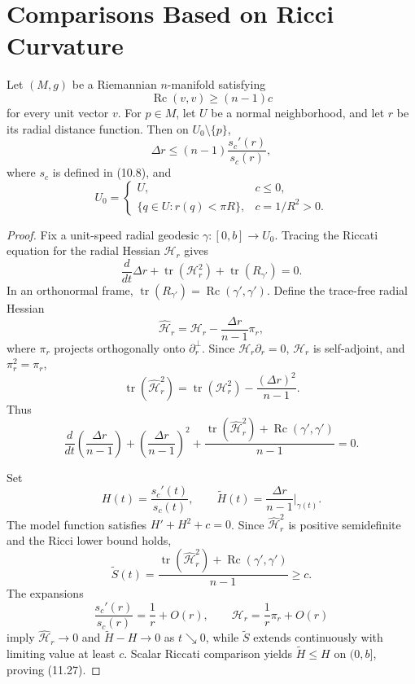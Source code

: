 \section{Comparisons Based on Ricci Curvature}

\begin{theorem}
\label{thm:laplacian-comparison-ii}

Let $(M,g)$ be a Riemannian $n$-manifold satisfying
\[
\operatorname{Rc}(v,v)\geq(n-1)c
\]
for every unit vector $v$. For $p\in M$, let $U$ be a normal neighborhood,
and let $r$ be its radial distance function. Then on
$U_0\setminus\{p\}$,
\begin{equation}
\Delta r\leq(n-1)\frac{s_c'(r)}{s_c(r)},
\tag{11.27}
\end{equation}
where $s_c$ is defined in (10.8), and
\[
U_0=
\begin{cases}
U,&c\leq0,\\
\{q\in U:r(q)<\pi R\},&c=1/R^2>0.
\end{cases}
\]
\end{theorem}

\begin{proof}
\sketch Fix a unit-speed radial geodesic
$\gamma:[0,b]\to U_0$. Tracing the Riccati equation for the radial Hessian
$\mathcal H_r$ gives
\begin{equation}
\frac d{dt}\Delta r
+\operatorname{tr}(\mathcal H_r^2)
+\operatorname{tr}(R_{\gamma'})=0.
\tag{11.28}
\end{equation}
In an orthonormal frame,
$\operatorname{tr}(R_{\gamma'})=\operatorname{Rc}(\gamma',\gamma')$.
Define the trace-free radial Hessian
\[
\widehat{\mathcal H}_r
=\mathcal H_r-\frac{\Delta r}{n-1}\pi_r,
\]
where $\pi_r$ projects orthogonally onto $\partial_r^\perp$. Since
$\mathcal H_r\partial_r=0$, $\mathcal H_r$ is self-adjoint, and
$\pi_r^2=\pi_r$,
\[
\operatorname{tr}(\widehat{\mathcal H}_r^2)
=\operatorname{tr}(\mathcal H_r^2)-\frac{(\Delta r)^2}{n-1}.
\]
Thus
\begin{equation}
\frac d{dt}\left(\frac{\Delta r}{n-1}\right)
+\left(\frac{\Delta r}{n-1}\right)^2
+\frac{
\operatorname{tr}(\widehat{\mathcal H}_r^2)
+\operatorname{Rc}(\gamma',\gamma')
}{n-1}=0.
\tag{11.30}
\end{equation}

Set
\[
H(t)=\frac{s_c'(t)}{s_c(t)},\qquad
\widetilde H(t)=\frac{\Delta r}{n-1}\bigg|_{\gamma(t)}.
\]
The model function satisfies $H'+H^2+c=0$. Since
$\widehat{\mathcal H}_r^2$ is positive semidefinite and the Ricci lower bound
holds,
\[
\widetilde S(t)
=\frac{
\operatorname{tr}(\widehat{\mathcal H}_r^2)
+\operatorname{Rc}(\gamma',\gamma')
}{n-1}
\geq c.
\]
The expansions
\[
\frac{s_c'(r)}{s_c(r)}=\frac1r+O(r),
\qquad
\mathcal H_r=\frac1r\pi_r+O(r)
\]
imply
$\widehat{\mathcal H}_r\to0$ and
$\widetilde H-H\to0$ as $t\searrow0$, while
$\widetilde S$ extends continuously with limiting value at least $c$.
Scalar Riccati comparison yields $\widetilde H\leq H$ on $(0,b]$, proving
(11.27).
\end{proof}

